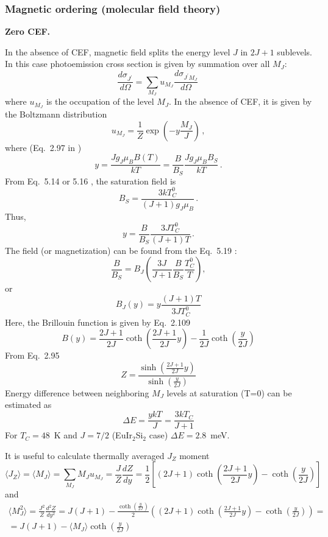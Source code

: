 \documentclass[a4paper,oneside,12pt]{extarticle}
\begin{document}
\subsubsection {Magnetic ordering (molecular field theory)}
\label{ssec:MField}
%
{\bf Zero CEF.}

In the absence of CEF, magnetic field splits the energy level $J$ in $2J+1$ sublevels. In this case photoemission cross section is given by summation over all $M_J$:
$$
\frac{d \sigma_{J^{\prime}}}{d \Omega} = \sum_{M_J} u_{M_J} \frac{d \sigma_{J^{\prime} M_J}}{d \Omega} \,
$$
where $u_{M_J}$ is the occupation of the level $M_J$. In the absence of CEF, it is given by the Boltzmann distribution \cite{Getzlaff_2008}
$$
u_{M_J} = \frac{1}{Z} \exp \left(- y \frac{M_J}{J} \right) \,,
$$
%
where (Eq.~2.97 in \cite{Getzlaff_2008})
%
$$
y = \frac{J g_J \mu_B B(T)}{kT} = \frac{B}{B_S} \frac{J g_J \mu_B B_S}{kT} \,.
$$
From Eq.~5.14 or 5.16 \cite{Getzlaff_2008}, the saturation field is
$$
B_S = \frac{3kT_C^0}{(J+1) g_J \mu_B} \,.
$$
Thus,
$$
y = \frac{B}{B_S} \frac{3 J T_C^0}{(J+1) T} \,.
$$
The field (or magnetization) can be found from the Eq.~5.19 \cite{Getzlaff_2008}:
$$
\frac{B}{B_S} = B_J \left( \frac{3J}{J+1} \frac{B}{B_S} \frac{T_C^0}{T} \right),
$$
or
\begin{equation}
B_J(y) = y \frac{(J+1) T}{3 J T_C^0}
\label{eq:BrilEq}
\end{equation}
Here, the Brillouin function is given by Eq.~2.109 \cite{Getzlaff_2008}
$$
B(y) = \frac{2J+1}{2J} \coth \left( \frac{2J+1}{2J} y \right)
- \frac{1}{2J} \coth \left( \frac{y}{2J} \right)
$$
From Eq.~2.95 \cite{Getzlaff_2008}
$$
Z = \frac{\sinh\left(\frac{2J+1}{2J}y\right)}{\sinh\left(\frac{y}{2J}\right)}
$$
Energy difference between neighboring $M_J$ levels at saturation (T=0) can be estimated as
$$
\Delta E = \frac{y kT}{J} = \frac{3kT_C}{J+1}
$$
For $T_C=48$~K and $J=7/2$ (EuIr$_2$Si$_2$ case)  $\Delta E = 2.8$~meV.

It is useful to calculate thermally averaged $J_Z$ moment
$$
\langle J_Z \rangle = \langle M_J \rangle =\sum_{M_J} M_J u_{M_J} = \frac{J}{Z} \frac{dZ}{dy} = \frac{1}{2} \left[ (2J+1) \coth\left(\frac{2J+1}{2J}y\right) 
- \coth\left(\frac{y}{2J}\right)\right]
$$
and
\begin{multline}
\langle M^2_J \rangle = \frac{J^2}{Z} \frac{d^2Z}{dy^2} = J(J+1) - \frac{\coth\left(\frac{y}{2J}\right)}{2}
\left((2J+1) \coth\left(\frac{2J+1}{2J}y\right) - \coth\left(\frac{y}{2J}\right)\right) = \\ =
J(J+1) - \langle M_J \rangle \coth\left(\frac{y}{2J}\right)
\label{eq:MJ2}
\end{multline}
%
\end{document}
